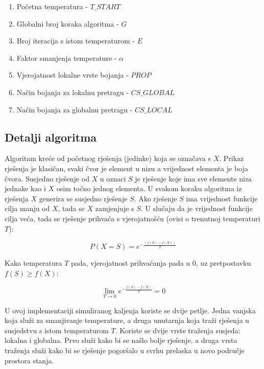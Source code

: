 \documentclass[times, utf8, diplomski, numeric]{fer}
\begin{document}
\begin{enumerate}
	\item Početna temperatura - $T\_START$
	\item Globalni broj koraka algoritma - $G$
	\item Broj iteracija s istom temperaturom - $E$
	\item Faktor smanjenja temperature - $\alpha$
	\item Vjerojatnost lokalne vrste bojanja - $PROP$
	\item Način bojanja za lokalnu pretragu - $CS\_GLOBAL$
	\item Način bojanja za globalnu pretragu - $CS\_LOCAL$
\end{enumerate}

\subsection{Detalji algoritma}

Algoritam kreće od početnog rješenja (jedinke) koja se označava s $X$. Prikaz rješenja je klasičan, svaki čvor je element u nizu a vrijednost elementa je boja čvora. Susjedno rješenje od $X$ u oznaci $S$ je rješenje koje ima sve elemente niza jednake kao i $X$ osim točno jednog elementa. U svakom koraku algoritma iz rješenja $X$ generira se susjedno rješenje $S$. Ako rješenje $S$ ima vrijednost funkcije cilja manju od $X$, tada se $X$ zamjenjuje s $S$. U slučaju da je vrijednost funkcije cilja veća, tada se rješenje prihvaća s vjerojatnošću (ovisi o trenutnoj temperaturi $T$):
 
\begin{equation}
	P(X=S) = e^{-\frac{(f(S)-f(X))}{T}}
\end{equation}

Kako temperatura $T$ pada, vjerojatnost prihvaćanja pada u $0$, uz pretpostavku $f(S)\ge f(X)$:

\begin{equation}
	\lim_{T\rightarrow 0 } e^{-\frac{f(S)-f(X)}{T}} = 0	
\end{equation}

U ovoj implementaciji simuliranog kaljenja koriste se dvije petlje. Jedna vanjska koja služi za smanjivanje temperature, a druga unutarnja koja traži rješenja u susjedstvu s istom temperaturom $T$. Koriste se dvije vrste traženja susjeda: lokalna i globalna. Prvo služi kako bi se našlo bolje rješenje, a druga vrsta traženja služi kako bi se rješenje pogoršalo u svrhu prelaska u novo područje prostora stanja. 
\end{document}
